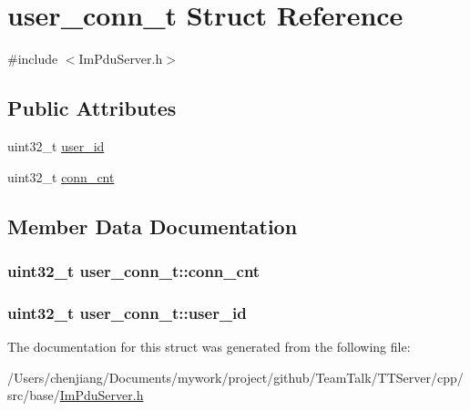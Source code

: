 \hypertarget{structuser__conn__t}{}\section{user\+\_\+conn\+\_\+t Struct Reference}
\label{structuser__conn__t}


{\ttfamily \#include $<$Im\+Pdu\+Server.\+h$>$}

\subsection*{Public Attributes}
\begin{DoxyCompactItemize}
\item 
uint32\+\_\+t \hyperlink{structuser__conn__t_a201f4520462f77bf5a156ab3ddf81dd2}{user\+\_\+id}
\item 
uint32\+\_\+t \hyperlink{structuser__conn__t_a452306c33a2d6057f8966a3b5debe5e9}{conn\+\_\+cnt}
\end{DoxyCompactItemize}


\subsection{Member Data Documentation}
\hypertarget{structuser__conn__t_a452306c33a2d6057f8966a3b5debe5e9}{}
\subsubsection[{conn\+\_\+cnt}]{\setlength{\rightskip}{0pt plus 5cm}uint32\+\_\+t user\+\_\+conn\+\_\+t\+::conn\+\_\+cnt}\label{structuser__conn__t_a452306c33a2d6057f8966a3b5debe5e9}
\hypertarget{structuser__conn__t_a201f4520462f77bf5a156ab3ddf81dd2}{}
\subsubsection[{user\+\_\+id}]{\setlength{\rightskip}{0pt plus 5cm}uint32\+\_\+t user\+\_\+conn\+\_\+t\+::user\+\_\+id}\label{structuser__conn__t_a201f4520462f77bf5a156ab3ddf81dd2}


The documentation for this struct was generated from the following file\+:\begin{DoxyCompactItemize}
\item 
/\+Users/chenjiang/\+Documents/mywork/project/github/\+Team\+Talk/\+T\+T\+Server/cpp/src/base/\hyperlink{_im_pdu_server_8h}{Im\+Pdu\+Server.\+h}\end{DoxyCompactItemize}
